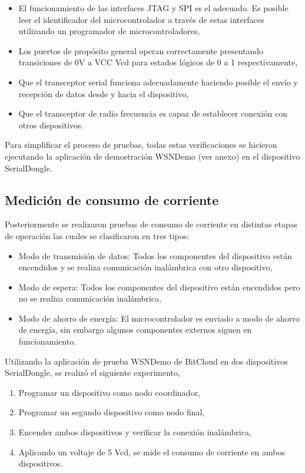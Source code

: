 \begin{itemize}
\item El funcionamiento de las interfaces JTAG y SPI es el adecuado. Es posible leer el identificador del microcontrolador a trav\'es de estas interfaces utilizando un programador de microcontroladores,
\item Los puertos de prop\'osito general operan correctamente presentando transiciones de 0V a VCC Vcd para estados l\'ogicos de 0 a 1 respectivamente,
\item Que el transceptor serial funciona adecuadamente haciendo posible el env\'io y recepci\'on de datos desde y hacia el dispositivo, 
\item Que el transceptor de radio frecuencia es capaz de establecer conexi\'on con otros dispositivos.
\end{itemize}

Para simplificar el proceso de pruebas, todas estas verificaciones se hicieron ejecutando la aplicaci\'on de demostraci\'on WSNDemo (ver anexo) en el dispositivo SerialDongle.

\subsection{Medici\'on de consumo de corriente}

Posteriormente se realizaron pruebas de consumo de corriente en distintas etapas de operaci\'on las cuales se clasificaron en tres tipos: 

\begin{itemize}
\item Modo de transmisi\'on de datos: Todos los componentes del dispositivo est\'an encendidos y se realiza comunicaci\'on inal\'ambrica con otro dispositivo,
\item Modo de espera: Todos los componentes del dispositivo est\'an encendidos pero no se realiza comunicaci\'on inal\'ambrica, 
\item Modo de ahorro de energ\'ia: El microcontrolador es enviado a modo de ahorro de energ\'ia, sin embargo algunos componentes externos siguen en funcionamiento. 
\end{itemize}

Utilizando la aplicaci\'on de prueba WSNDemo de BitCloud en dos dispositivos SerialDongle, se realiz\'o el siguiente experimento,

\begin{enumerate}
\item Programar un dispositivo como nodo coordinador,
\item Programar un segundo dispositivo como nodo final,
\item Encender ambos dispositivos y verificar la conexi\'on inal\'ambrica,
\item Aplicando un voltaje de 5 Vcd, se mide el consumo de corriente en ambos dispositivos. 
\end{enumerate}

